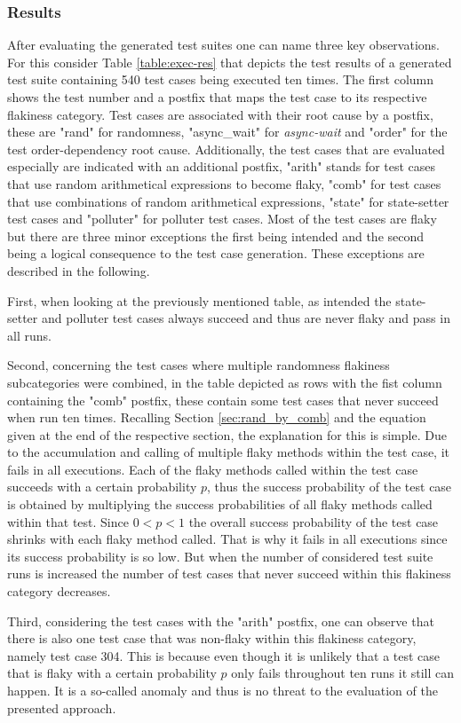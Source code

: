 \documentclass[
fancyheadings, %
%
%
]{stsreprt}
\begin{document}
\subsubsection{Results}
After evaluating the generated test suites one can name three key observations.
For this consider Table \ref{table:exec-res} that depicts the test results of a generated test suite containing 540 test cases being executed ten times. The first column shows the test number and a postfix that maps the test case to its respective flakiness category.
Test cases are associated with their root cause by a postfix, these are "rand" for randomness, "async\_wait" for \textit{async-wait} and "order" for the test order-dependency root cause.
Additionally, the test cases that are evaluated especially are indicated with an additional postfix, "arith" stands for test cases that use random arithmetical expressions to become flaky, "comb" for test cases that use combinations of random arithmetical expressions, "state" for state-setter test cases and "polluter" for polluter test cases.  
Most of the test cases are flaky but there are three minor exceptions the first being intended and the second being a logical consequence to the test case generation. These exceptions are described in the following. \par
First, when looking at the previously mentioned table, as intended the state-setter and polluter test cases always succeed and thus are never flaky and pass in all runs. \par
Second, concerning the test cases where multiple randomness flakiness subcategories were combined, in the table depicted as rows with the fist column containing the "comb" postfix, these contain some test cases that never succeed when run ten times. 
Recalling Section \ref{sec:rand_by_comb} and the equation given at the end of the respective section, the explanation for this is simple. 
Due to the accumulation and calling of multiple flaky methods within the test case, it fails in all executions. 
Each of the flaky methods called within the test case succeeds with a certain probability $p$, thus the success probability of the test case is obtained by multiplying the success probabilities of all flaky methods called within that test. 
Since $0 < p < 1$ the overall success probability of the test case shrinks with each flaky method called. 
That is why it fails in all executions since its success probability is so low. 
But when the number of considered test suite runs is increased the number of test cases that never succeed within this flakiness category decreases. \par
Third, considering the test cases with the "arith" postfix, one can observe that there is also one test case that was non-flaky within this flakiness category, namely test case 304. 
This is because even though it is unlikely that a test case that is flaky with a certain probability $p$ only fails throughout ten runs it still can happen.
It is a so-called anomaly and thus is no threat to the evaluation of the presented approach. 
\end{document}
